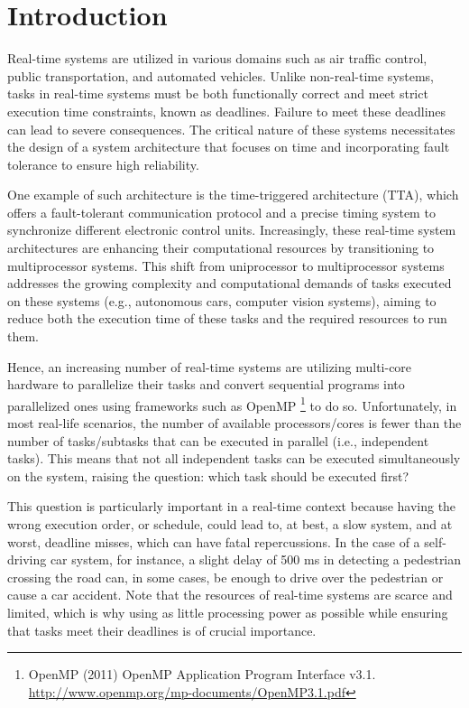\section{Introduction}
\label{sec:intro}

Real-time systems are utilized in various domains such as air traffic 
control, public transportation, and automated vehicles. Unlike non-real-time systems, 
tasks in real-time systems must be both functionally correct and meet strict 
 execution time constraints, known as deadlines. Failure 
to meet these deadlines can lead to severe consequences. The critical 
nature of these systems necessitates the design of a system 
architecture that focuses on time and incorporating fault tolerance 
to ensure high reliability.

One example of such architecture is the time-triggered 
architecture (TTA)\cite{kopetz2003tta}\cite{kopetz1998timetriggered}, which offers a fault-tolerant 
communication protocol and a precise timing system to synchronize different electronic control units. 
Increasingly, these real-time system architectures are enhancing their 
computational resources by transitioning to multiprocessor systems. 
This shift from uniprocessor to multiprocessor systems addresses 
the growing complexity and computational demands of tasks executed 
on these systems (e.g., autonomous cars, computer vision systems), aiming to reduce both the execution time of these 
tasks and the required resources to run them\cite{maiza2019survey}.

Hence, an increasing number of real-time systems are 
utilizing multi-core hardware to parallelize their tasks 
and convert sequential programs into parallelized ones using 
frameworks such as OpenMP
\footnote{OpenMP (2011) OpenMP Application Program Interface v3.1. 
\url{http://www.openmp.org/mp-documents/OpenMP3.1.pdf}} to do so. 
Unfortunately, in most real-life scenarios, the number of available 
processors/cores is fewer than the number of tasks/subtasks that 
can be executed in parallel (i.e., independent tasks). This means 
that not all independent tasks can be executed simultaneously on 
the system, raising the question: which task should be executed first?

This question is particularly important in a real-time context
because having the wrong execution order, or schedule, could lead 
to, at best, a slow system, and at worst, deadline misses, which 
can have fatal repercussions\cite{ABBOTT2018RealtimeDeadlineMissCons}. In the case of a self-driving car 
system, for instance, a slight delay of 500 ms in detecting a pedestrian 
crossing the road can, in some cases, be enough to drive over 
the pedestrian or cause a car accident. Note that the resources of 
real-time systems are scarce and limited, which is why using as 
little processing power as possible while ensuring that tasks meet 
their deadlines is of crucial importance.

